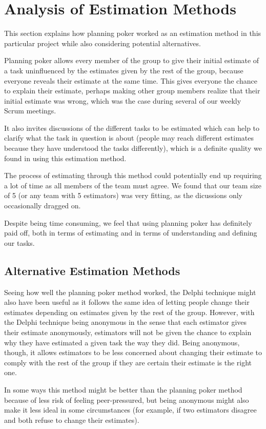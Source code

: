\section{Analysis of Estimation Methods}
\label{sec:AnalysisEstimation}
This section explains how planning poker worked as an estimation method in this
particular project while also considering potential alternatives.

Planning poker allows every member of the group to give their initial estimate
of a task uninfluenced by the estimates given by the rest of the group, because
everyone reveals their estimate at the same time. This gives everyone the chance
to explain their estimate, perhaps making other group members realize that their
initial estimate was wrong, which was the case during several of our weekly Scrum
meetings.

It also invites discussions of the different tasks to be estimated which can
help to clarify what the task in question is about (people may reach different
estimates because they have understood the tasks differently), which is a
definite quality we found in using this estimation method.

The process of estimating through this method could potentially end up requiring
a lot of time as all members of the team must agree. We found that our team size
of 5 (or any team with 5 estimators) was very fitting, as the dicussions only
occasionally dragged on.

Despite being time consuming, we feel that using planning poker has definitely
paid off, both in terms of estimating and in terms of understanding and defining
our tasks.

\subsection{Alternative Estimation Methods}
Seeing how well the planning poker method worked, the Delphi
technique\cite[ch.~9.3.5]{caye} might also have been useful as it follows the same idea of
letting people change their estimates depending on estimates given by the rest
of the group. However, with the Delphi technique being anonymous in the sense
that each estimator gives their estimate anonymously, estimators will not be
given the chance to explain why they have estimated a given task the way they
did. Being anonymous, though, it allows estimators to be less concerned about
changing their estimate to comply with the rest of the group if they are certain
their estimate is the right one.

In some ways this method might be better than the planning poker method because
of less risk of feeling peer-pressured, but being anonymous might also make it
less ideal in some circumstances (for example, if two estimators disagree and
both refuse to change their estimates).
